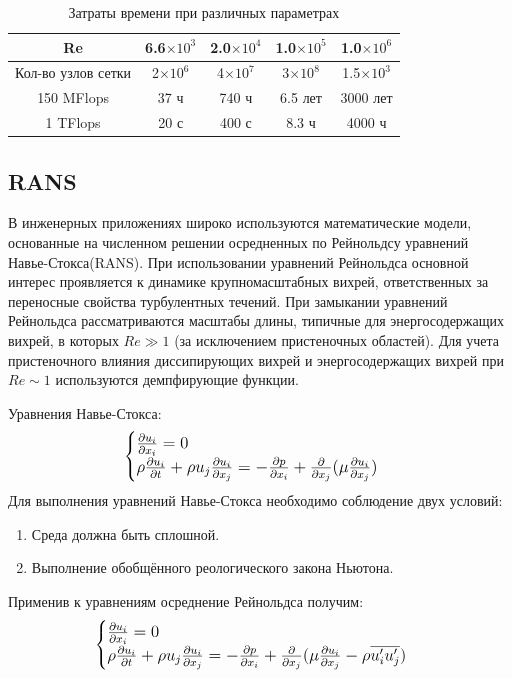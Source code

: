 	\begin{table}[H]
		\begin{center}
			\begin{tabular}{|c|c|c|c|c|}
				\hline
				Re & 6.6$\times10^3$ & 2.0$\times10^4$ & 1.0$\times10^5$ & 1.0$\times10^6$\\
				\hline
				Кол-во узлов сетки & 2$\times10^6$ & 4$\times10^7$ & 3$\times10^8$ & 1.5$\times10^3$\\
				\hline
				150 MFlops & 37 ч & 740 ч & 6.5 лет & 3000 лет\\
				\hline
				1 TFlops & 20 с & 400 с & 8.3 ч & 4000 ч\\
				\hline
			\end{tabular}
		\end{center}
		\caption{Затраты времени при различных параметрах}
	\end{table}

\subsection{RANS}
	
	В инженерных приложениях широко используются математические модели, основанные на численном решении осредненных по Рейнольдсу уравнений Навье-Стокса(RANS). При использовании уравнений Рейнольдса основной интерес проявляется к динамике крупномасштабных вихрей, ответственных за переносные свойства турбулентных течений. При замыкании уравнений Рейнольдса рассматриваются масштабы длины, типичные для энергосодержащих вихрей, в которых $Re\gg1$ (за исключением пристеночных областей). Для учета пристеночного влияния диссипирующих вихрей и энергосодержащих вихрей при $Re\sim1$ используются демпфирующие функции.
	
	Уравнения Навье-Стокса:
	\begin{equation}
		\large{\begin{cases}
				\frac{\partial u_i}{\partial x_i} = 0
				\\
				\rho\frac{\partial u_i}{\partial t} + \rho u_j \frac{\partial u_i}{\partial x_j} = - \frac{\partial p}{\partial x_i} + \frac{\partial}{\partial x_j}(\mu\frac{\partial u_i}{\partial x_j})
		\end{cases}}
	\end{equation}
	Для выполнения уравнений Навье-Стокса необходимо соблюдение двух условий:
	\begin{enumerate}
		\item Среда должна быть сплошной.
		\item Выполнение обобщённого реологического закона Ньютона.
	\end{enumerate}
	Применив к уравнениям осреднение Рейнольдса получим:
	\begin{equation}
		\large{\begin{cases}
				\frac{\partial u_i}{\partial x_i} = 0
				\\
				\rho\frac{\partial u_i}{\partial t} + \rho u_j \frac{\partial u_i}{\partial x_j} = - \frac{\partial p}{\partial x_i} + \frac{\partial}{\partial x_j}(\mu\frac{\partial u_i}{\partial x_j} - \rho\overline{u_i' u_j'})
		\end{cases}}
	\end{equation}
	
